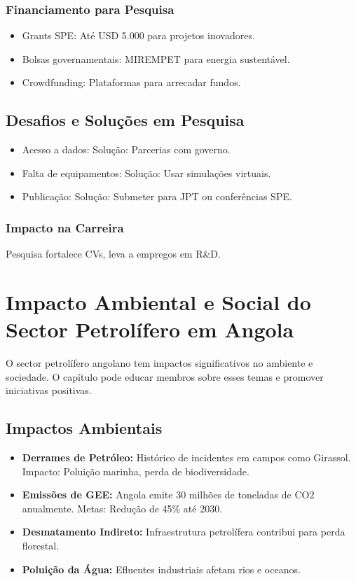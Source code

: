 \documentclass[12pt]{article}
\begin{document}
\subsubsection{Financiamento para Pesquisa}
\begin{itemize}
    \item Grants SPE: Até USD 5.000 para projetos inovadores.
    \item Bolsas governamentais: MIREMPET para energia sustentável.
    \item Crowdfunding: Plataformas para arrecadar fundos.
\end{itemize}

\subsection{Desafios e Soluções em Pesquisa}
\begin{itemize}
    \item Acesso a dados: Solução: Parcerias com governo.
    \item Falta de equipamentos: Solução: Usar simulações virtuais.
    \item Publicação: Solução: Submeter para JPT ou conferências SPE.
\end{itemize}

\subsubsection{Impacto na Carreira}
Pesquisa fortalece CVs, leva a empregos em R\&D.

\section{Impacto Ambiental e Social do Sector Petrolífero em Angola}

O sector petrolífero angolano tem impactos significativos no ambiente e sociedade. O capítulo pode educar membros sobre esses temas e promover iniciativas positivas.

\subsection{Impactos Ambientais}
\begin{itemize}
    \item \textbf{Derrames de Petróleo:} Histórico de incidentes em campos como Girassol. Impacto: Poluição marinha, perda de biodiversidade.
    \item \textbf{Emissões de GEE:} Angola emite 30 milhões de toneladas de CO2 anualmente. Metas: Redução de 45\% até 2030.
    \item \textbf{Desmatamento Indireto:} Infraestrutura petrolífera contribui para perda florestal.
    \item \textbf{Poluição da Água:} Efluentes industriais afetam rios e oceanos.
\end{itemize}
\end{document}
